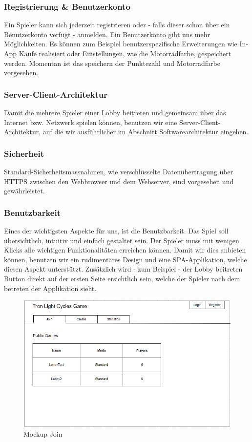 \documentclass[11pt,ngerman]{article}
\begin{document}
    \subsubsection{Registrierung \& Benutzerkonto}
    Ein Spieler kann sich jederzeit registrieren oder - falls dieser  schon über ein Benutzerkonto verfügt - anmelden. Ein Benutzerkonto gibt uns mehr Möglichkeiten. Es können zum Beispiel benutzerspezifische Erweiterungen wie In-App Käufe realisiert oder Einstellungen, wie die Motorradfarbe, gespeichert werden. Momentan ist das speichern der Punktezahl und Motorradfarbe vorgesehen.
    \subsubsection{Server-Client-Architektur}
    Damit die  mehrere Spieler einer Lobby beitreten und gemeinsam über das Internet bzw. Netzwerk spielen können, benutzen wir eine Server-Client-Architektur, auf die wir ausführlicher im \hyperref[sec:Softwarearchitektur]{Abschnitt Softwarearchitektur} eingehen.
    \subsubsection{Sicherheit}
    Standard-Sicherheitsmassnahmen, wie verschlüsselte Datenübertragung über \Gls{HTTPS} zwischen den \Gls{Webbrowser} und dem \Gls{Webserver}, sind vorgesehen und gewährleistet.
    \subsubsection{Benutzbarkeit}
    Eines der wichtigsten Aspekte für uns, ist die Benutzbarkeit. Das Spiel soll übersichtlich, intuitiv und einfach gestaltet sein. Der Spieler muss mit wenigen Klicks alle wichtigen Funktionalitäten erreichen können. Damit wir dies anbieten können, benutzen wir ein rudimentäres Design und eine \Gls{SPA}-Applikation, welche diesen Aspekt unterstützt. Zusätzlich wird - zum Beispiel - der \Gls{Lobby} beitreten Button direkt auf der ersten Seite ersichtlich sein, welche der Spieler nach dem betreten der Applikation sieht.
    \begin{figure}[H]
    	\centering
    	\includegraphics[scale=0.6]{figures/Mockup_Join.png}
    	\caption{Mockup Join}
    	\label{fig:MockupJoin}
    \end{figure}
\end{document}
